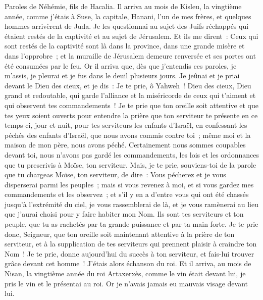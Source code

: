 \begin{multicols}{2}
\VerseOne{}Paroles de Néhémie, fils de Hacalia. Il arriva au mois de Kisleu, la vingtième année, comme j'étais à Suse, la capitale,
Hanani, l'un de mes frères, et quelques hommes arrivèrent de Juda. Je les questionnai au sujet des Juifs réchappés qui étaient restés de la captivité et au sujet de Jérusalem.
Et ils me dirent~: Ceux qui sont restés de la captivité sont là dans la province, dans une grande misère et dans l'opprobre~; et la muraille de Jérusalem demeure renversée et ses portes ont été consumées par le feu.
Or il arriva que, dès que j'entendis ces paroles, je m'assis, je pleurai et je fus dans le deuil plusieurs jours. Je jeûnai et je priai devant le Dieu des cieux,
 et je dis~: Je te prie, ô Yahweh~! Dieu des cieux, Dieu grand et redoutable, qui garde l'alliance et la miséricorde de ceux qui t'aiment et qui observent tes commandements~!
Je te prie que ton oreille soit attentive et que tes yeux soient ouverts pour entendre la prière que ton serviteur te présente en ce temps-ci, jour et nuit, pour tes serviteurs les enfants d'Israël, en confessant les péchés des enfants d'Israël, que nous avons commis contre toi~; même moi et la maison de mon père, nous avons péché.
Certainement nous sommes coupables devant toi, nous n'avons pas gardé les commandements, les lois et les ordonnances que tu prescrivis à Moïse, ton serviteur.
Mais, je te prie, souviens-toi de la parole que tu chargeas Moïse, ton serviteur, de dire~: Vous pécherez et je vous disperserai parmi les peuples~;
mais si vous revenez à moi, et si vous gardez mes commandements et les observez~; et s'il y en a d'entre vous qui ont été chassés jusqu'à l'extrémité du ciel, je vous rassemblerai de là, et je vous ramènerai au lieu que j'aurai choisi pour y faire habiter mon Nom.
Ils sont tes serviteurs et ton peuple, que tu as rachetés par ta grande puissance et par ta main forte.
Je te prie donc, Seigneur, que ton oreille soit maintenant attentive à la prière de ton serviteur, et à la supplication de tes serviteurs qui prennent plaisir à craindre ton Nom~! Je te prie, donne aujourd'hui du succès à ton serviteur, et fais-lui trouver grâce devant cet homme~! J'étais alors échanson du roi.
\VerseOne{}Et il arriva, au mois de Nisan, la vingtième année du roi Artaxerxès, comme le vin était devant lui, je pris le vin et le présentai au roi. Or je n'avais jamais eu mauvais visage devant lui.

\end{multicols}
